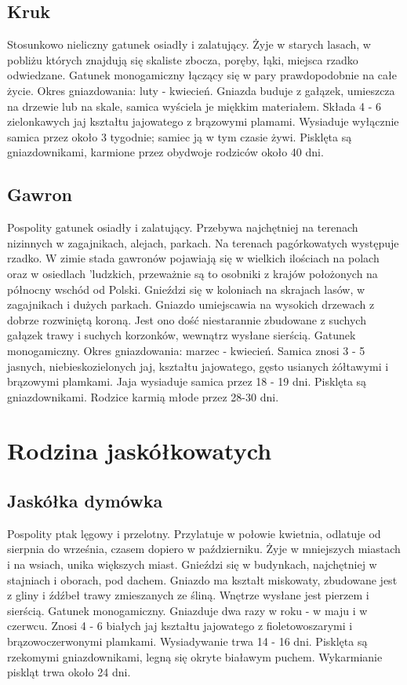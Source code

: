 \documentclass[a4paper,12pt,twoside]{article}
\begin{document}
\subsection{Kruk}

Stosunkowo nieliczny gatunek osiadły i zalatujący. Żyje w starych lasach, w pobliżu których znajdują się skaliste zbocza, poręby, łąki, miejsca rzadko odwiedzane. Gatunek monogamiczny łączący się w pary prawdopodobnie na całe życie. Okres gniazdowania: luty - kwiecień. Gniazda buduje z gałązek, umieszcza na drzewie lub na skale, samica wyściela je miękkim materiałem. Składa 4 - 6 zielonkawych jaj kształtu jajowatego z brązowymi plamami. Wysiaduje wyłącznie samica przez około 3 tygodnie; samiec ją w tym czasie żywi. Pisklęta są gniazdownikami, karmione przez obydwoje rodziców około 40 dni. 

\subsection{Gawron}

Pospolity gatunek osiadły i zalatujący. Przebywa najchętniej na terenach nizinnych w zagajnikach, alejach, parkach. Na terenach pagórkowatych występuje rzadko. W zimie stada gawronów pojawiają się w wielkich ilościach na polach oraz w osiedlach 'ludzkich, przeważnie są to osobniki z krajów położonych na północny wschód od Polski. Gnieździ się w koloniach na skrajach lasów, w zagajnikach i dużych parkach. Gniazdo umiejscawia na wysokich drzewach z dobrze rozwiniętą koroną. Jest ono dość niestarannie zbudowane z suchych gałązek trawy i suchych korzonków, wewnątrz wysłane sierścią. Gatunek monogamiczny. Okres gniazdowania: marzec - kwiecień. Samica znosi 3 - 5 jasnych, niebieskozielonych jaj, kształtu jajowatego, gęsto usianych żółtawymi i brązowymi plamkami. Jaja wysiaduje samica przez 18 - 19 dni. Pisklęta są gniazdownikami. Rodzice karmią młode przez 28-30 dni. 

\section{Rodzina jaskółkowatych}

\subsection{Jaskółka dymówka}

Pospolity ptak lęgowy i przelotny. Przylatuje w połowie kwietnia, odlatuje od sierpnia do września, czasem dopiero w październiku. Żyje w mniejszych miastach i na wsiach, unika większych miast. Gnieździ się w budynkach, najchętniej w stajniach i oborach, pod dachem. Gniazdo ma kształt miskowaty, zbudowane jest z gliny i źdźbeł trawy zmieszanych ze śliną. Wnętrze wysłane jest pierzem i sierścią. Gatunek monogamiczny. Gniazduje dwa razy w roku - w maju i w czerwcu. Znosi 4 - 6 białych jaj kształtu jajowatego z fioletowoszarymi i brązowoczerwonymi plamkami. Wysiadywanie trwa 14 - 16 dni. Pisklęta są rzekomymi gniazdownikami, legną się okryte białawym puchem. Wykarmianie piskląt trwa około 24 dni. 
\end{document}
